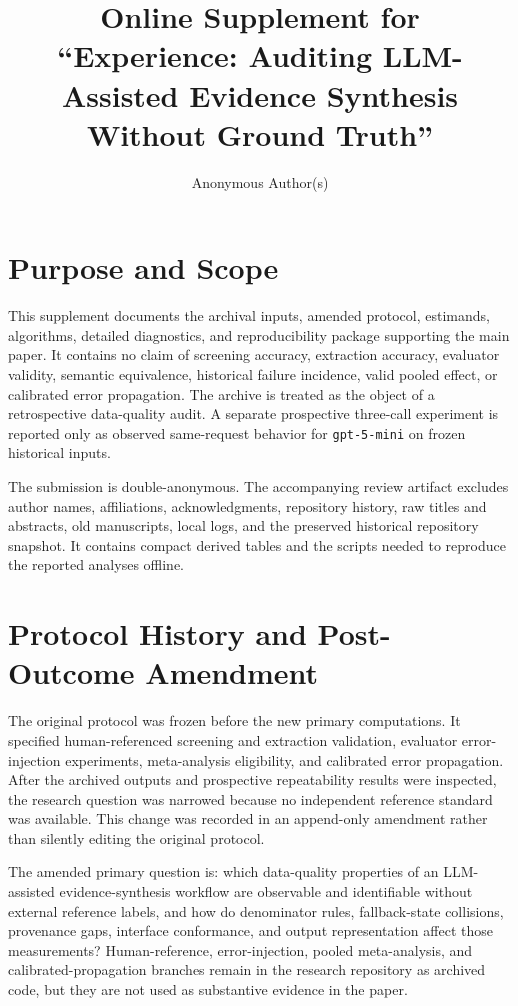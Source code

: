 \documentclass[acmsmall,anonymous,review]{acmart}
\title{Online Supplement for ``Experience: Auditing LLM-Assisted Evidence Synthesis Without Ground Truth''}
\author{Anonymous Author(s)}
\affiliation{\institution{Anonymous Institution}\country{Anonymous}}
\begin{document}
\maketitle

\section{Purpose and Scope}

This supplement documents the archival inputs, amended protocol, estimands, algorithms, detailed diagnostics, and reproducibility package supporting the main paper. It contains no claim of screening accuracy, extraction accuracy, evaluator validity, semantic equivalence, historical failure incidence, valid pooled effect, or calibrated error propagation. The archive is treated as the object of a retrospective data-quality audit. A separate prospective three-call experiment is reported only as observed same-request behavior for \texttt{gpt-5-mini} on frozen historical inputs.

The submission is double-anonymous. The accompanying review artifact excludes author names, affiliations, acknowledgments, repository history, raw titles and abstracts, old manuscripts, local logs, and the preserved historical repository snapshot. It contains compact derived tables and the scripts needed to reproduce the reported analyses offline.

\section{Protocol History and Post-Outcome Amendment}

The original protocol was frozen before the new primary computations. It specified human-referenced screening and extraction validation, evaluator error-injection experiments, meta-analysis eligibility, and calibrated error propagation. After the archived outputs and prospective repeatability results were inspected, the research question was narrowed because no independent reference standard was available. This change was recorded in an append-only amendment rather than silently editing the original protocol.

The amended primary question is: which data-quality properties of an LLM-assisted evidence-synthesis workflow are observable and identifiable without external reference labels, and how do denominator rules, fallback-state collisions, provenance gaps, interface conformance, and output representation affect those measurements? Human-reference, error-injection, pooled meta-analysis, and calibrated-propagation branches remain in the research repository as archived code, but they are not used as substantive evidence in the paper.
\end{document}

